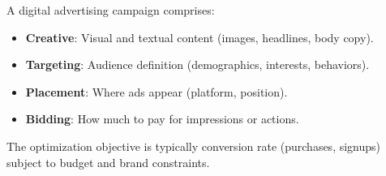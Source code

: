 A digital advertising campaign comprises:

\begin{itemize}
\item \textbf{Creative}: Visual and textual content (images, headlines, body copy).
\item \textbf{Targeting}: Audience definition (demographics, interests, behaviors).
\item \textbf{Placement}: Where ads appear (platform, position).
\item \textbf{Bidding}: How much to pay for impressions or actions.
\end{itemize}

The optimization objective is typically conversion rate (purchases, signups) subject to budget and brand constraints.

